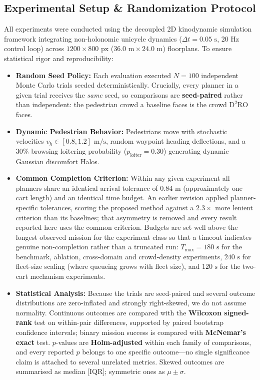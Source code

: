 \documentclass[journal]{IEEEtran}
\begin{document}
\subsection{Experimental Setup \& Randomization Protocol}
All experiments were conducted using the decoupled 2D kinodynamic simulation framework integrating non-holonomic unicycle dynamics ($\Delta t = 0.05\text{ s}$, 20 Hz control loop) across $1200 \times 800\text{ px}$ ($36.0\text{ m} \times 24.0\text{ m}$) floorplans. To ensure statistical rigor and reproducibility:
\begin{itemize}
    \item \textbf{Random Seed Policy:} Each evaluation executed $N=100$ independent Monte Carlo trials seeded deterministically. Crucially, every planner in a given trial receives the \emph{same} seed, so comparisons are \textbf{seed-paired} rather than independent: the pedestrian crowd a baseline faces is the crowd $\text{D}^2\text{RO}$ faces.
    \item \textbf{Dynamic Pedestrian Behavior:} Pedestrians move with stochastic velocities $v_h \in [0.8, 1.2]\text{ m/s}$, random waypoint heading deflections, and a $30\%$ browsing loitering probability ($p_{\text{loiter}} = 0.30$) generating dynamic Gaussian discomfort Halos.
    \item \textbf{Common Completion Criterion:} Within any given experiment all planners share an identical arrival tolerance of $0.84\text{ m}$ (approximately one cart length) and an identical time budget. An earlier revision applied planner-specific tolerances, scoring the proposed method against a $2.3\times$ more lenient criterion than its baselines; that asymmetry is removed and every result reported here uses the common criterion. Budgets are set well above the longest observed mission for the experiment class so that a timeout indicates genuine non-completion rather than a truncated run: $T_{\max} = 180\text{ s}$ for the benchmark, ablation, cross-domain and crowd-density experiments, $240\text{ s}$ for fleet-size scaling (where queueing grows with fleet size), and $120\text{ s}$ for the two-cart mechanism experiments.
    \item \textbf{Statistical Analysis:} Because the trials are seed-paired and several outcome distributions are zero-inflated and strongly right-skewed, we do not assume normality. Continuous outcomes are compared with the \textbf{Wilcoxon signed-rank} test on within-pair differences, supported by paired bootstrap confidence intervals; binary mission success is compared with \textbf{McNemar's exact} test. $p$-values are \textbf{Holm-adjusted} within each family of comparisons, and every reported $p$ belongs to one specific outcome---no single significance claim is attached to several unrelated metrics. Skewed outcomes are summarised as median [IQR]; symmetric ones as $\mu \pm \sigma$.
\end{itemize}
\end{document}
